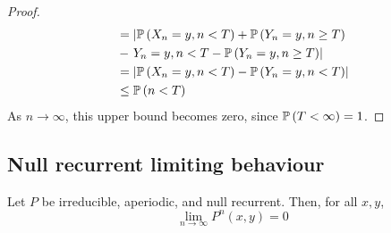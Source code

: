 \begin{proof}
\begin{align*}
		                              & = \left| \mathbb{P}\left({X_n = y, n < T}\right) + \mathbb{P}\left({Y_n = y, n \geq T}\right) \right.
		\\
		                              & - \left.
		{Y_n = y, n < T} - \mathbb{P}\left({Y_n = y, n \geq T}\right) \right|                                               \\
		                              & = \abs{\mathbb{P}\left({X_n = y, n < T}\right) - \mathbb{P}\left({Y_n = y, n < T}\right)}             \\
		                              & \leq \mathbb{P}\left({n < T}\right)
	\end{align*}
	As \( n \to \infty \), this upper bound becomes zero, since \( \mathbb{P}\left({T < \infty}\right) = 1 \).
\end{proof}

\subsection{Null recurrent limiting behaviour}
\begin{theorem}
	Let \( P \) be irreducible, aperiodic, and null recurrent.
	Then, for all \( x, y \),
	\[
		\lim_{n \to \infty} P^n(x,y) = 0
	\]
\end{theorem}
